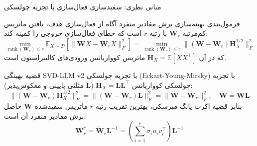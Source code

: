 \documentclass[aspectratio=169,10pt]{beamer}
\begin{document}
\begin{frame}{مبانی نظری: سفیدسازی فعال‌سازی با تجزیه چولسکی}
  \begin{block}{فرمول‌بندی بهینه‌سازی برش مقادیر منفرد آگاه از فعال‌سازی}
    \small
    هدف، یافتن ماتریس کم‌مرتبه $\mathbf{W}_r$ با رتبه $r$ است که خطای فعال‌سازی خروجی را کمینه کند:
    \vspace{-0.15cm}
    \[
      \min_{\operatorname{rank}(\mathbf{W}_r) \le r} \mathbb{E}_{X \sim \mathcal{D}}\left[ \| \mathbf{W} X - \mathbf{W}_r X \|_F^2 \right] = \min_{\operatorname{rank}(\mathbf{W}_r) \le r} \| (\mathbf{W} - \mathbf{W}_r) \mathbf{H}_X^{1/2} \|_F^2
    \]
    \vspace{-0.15cm}
    که در آن $\mathbf{H}_X = \mathbb{E}[X X^\top]$ ماتریس کوواریانس ورودی‌های کالیبراسیون است.
  \end{block}

  \begin{exampleblock}{قضیه بهینگی SVD-LLM v2 با تجزیه چولسکی (Eckart-Young-Mirsky)}
    \small
    با تجزیه چولسکی کوواریانس $\mathbf{H}_X = \mathbf{L} \mathbf{L}^\top$ ($\mathbf{L}$ مثلثی پایینی و معکوس‌پذیر):
    \vspace{-0.15cm}
    \[
      \| (\mathbf{W} - \mathbf{W}_r) \mathbf{H}_X^{1/2} \|_F^2 = \| (\mathbf{W} - \mathbf{W}_r) \mathbf{L} \|_F^2 = \| \widetilde{\mathbf{W}} - \widetilde{\mathbf{W}}_r \|_F^2, \quad \widetilde{\mathbf{W}} = \mathbf{W} \mathbf{L}
    \]
    \vspace{-0.15cm}
    بنابر قضیه اکرت-یانگ-میرسکی، بهترین تقریب رتبه-$r$ ماتریس سفیدشده $\widetilde{\mathbf{W}}$ حاصل برش مقادیر منفرد آن است:
    \vspace{-0.15cm}
    \[
      \mathbf{W}_r^* = \widetilde{\mathbf{W}}_r \mathbf{L}^{-1} = \left(\sum_{i=1}^r \sigma_i u_i v_i^\top\right) \mathbf{L}^{-1}
    \]
  \end{exampleblock}
\end{frame}
\end{document}
